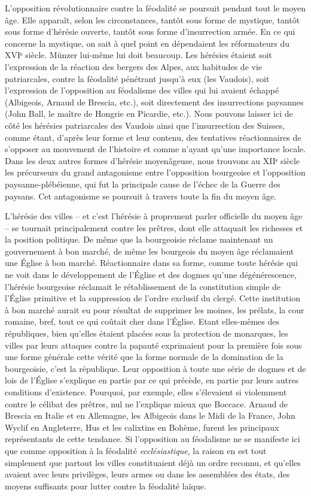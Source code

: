 \documentclass[french,twoside]{book} %
\begin{document}
L’opposition révolutionnaire contre la féodalité se poursuit pendant tout le moyen âge. Elle apparaît, selon les circonstances, tantôt sous forme de mystique, tantôt sous forme d’hérésie ouverte, tantôt sous forme d’insurrection armée. En ce qui concerne la mystique, on sait à quel point en dépendaient les réformateurs du XVIᵉ siècle. Münzer lui-même lui doit beaucoup. Les hérésies étaient soit l’expression de la réaction des bergers des Alpes, aux habitudes de vie patriarcales, contre la féodalité pénétrant jusqu’à eux (les Vaudois), soit l’expression de l’opposition au féodalisme des villes qui lui avaient échappé (Albigeois, Arnaud de Brescia, etc.), soit directement des insurrections paysannes (John Ball, le maître de Hongrie en Picardie, etc.). Nous pouvons laisser ici de côté les hérésies patriarcales des Vaudois ainsi que l’insurrection des Suisses, comme étant, d’après leur forme et leur contenu, des tentatives réactionnaires de s’opposer au mouvement de l’histoire et comme n’ayant qu’une importance locale. Dans les deux autres formes d’hérésie moyenâgeuse, nous trouvons au XIIᵉ siècle les précurseurs du grand antagonisme entre l’opposition bourgeoise et l’opposition paysanne-plébéienne, qui fut la principale cause de l’échec de la Guerre des paysans. Cet antagonisme se poursuit à travers toute la fin du moyen âge.\par
L’hérésie des villes – et c’est l’hérésie à proprement parler officielle du moyen âge – se tournait principalement contre les prêtres, dont elle attaquait les richesses et la position politique. De même que la bourgeoisie réclame maintenant un gouvernement à bon marché, de même les bourgeois du moyen âge réclamaient une Église à bon marché. Réactionnaire dans sa forme, comme toute hérésie qui ne voit dans le développement de l’Église et des dogmes qu’une dégénérescence, l’hérésie bourgeoise réclamait le rétablissement de la constitution simple de l’Église primitive et la suppression de l’ordre exclusif du clergé. Cette institution à bon marché aurait eu pour résultat de supprimer les moines, les prélats, la cour romaine, bref, tout ce qui coûtait cher dans l’Église. Etant elles-mêmes des républiques, bien qu’elles étaient placées sous la protection de monarques, les villes par leurs attaques contre la papauté exprimaient pour la première fois sous une forme générale cette vérité que la forme normale de la domination de la bourgeoisie, c’est la république. Leur opposition à toute une série de dogmes et de lois de l’Église s’explique en partie par ce qui précède, en partie par leurs autres conditions d’existence. Pourquoi, par exemple, elles s’élevaient si violemment contre le célibat des prêtres, nul ne l’explique mieux que Boccace. Arnaud de Brescia en Italie et en Allemagne, les Albigeois dans le Midi de la France, John Wyclif en Angleterre, Hus et les calixtins en Bohème, furent les principaux représentants de cette tendance. Si l’opposition au féodalisme ne se manifeste ici que comme opposition à la féodalité \emph{ecclésiastique}, la raison en est tout simplement que partout les villes constituaient déjà un ordre reconnu, et qu’elles avaient avec leurs privilèges, leurs armes ou dans les assemblées des états, des moyens suffisants pour lutter contre la féodalité laïque.\par
\end{document}
